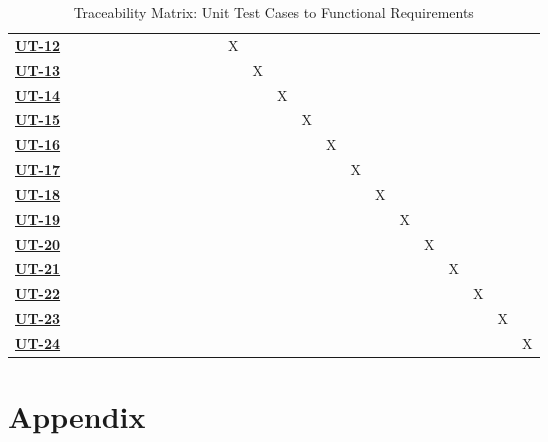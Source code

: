 \documentclass[12pt, titlepage]{article}
\begin{document}
\begin{enumerate}
\begin{landscape}
\begin{table}[H]
\begin{adjustbox}{width=1.4\textwidth}
\begin{tabular}{l|cccccccccccccccccccccccc}
        \hyperref[UT-12]{\textbf{UT-12}} &  &  &  &  &  &  &  &  &  &  &  & X &  &  &  &  &  &  &  &  &  &  &  &  \\
        \hyperref[UT-13]{\textbf{UT-13}} &  &  &  &  &  &  &  &  &  &  &  &  & X &  &  &  &  &  &  &  &  &  &  &  \\
        \hyperref[UT-14]{\textbf{UT-14}} &  &  &  &  &  &  &  &  &  &  &  &  &  & X &  &  &  &  &  &  &  &  &  &  \\
        \hyperref[UT-15]{\textbf{UT-15}} &  &  &  &  &  &  &  &  &  &  &  &  &  &  & X &  &  &  &  &  &  &  &  &  \\
        \hyperref[UT-16]{\textbf{UT-16}} &  &  &  &  &  &  &  &  &  &  &  &  &  &  &  & X &  &  &  &  &  &  &  &  \\
        \hyperref[UT-17]{\textbf{UT-17}} &  &  &  &  &  &  &  &  &  &  &  &  &  &  &  &  & X &  &  &  &  &  &  &  \\
        \hyperref[UT-17]{\textbf{UT-18}} &  &  &  &  &  &  &  &  &  &  &  &  &  &  &  &  & & X  &  &  &  &  &  &  \\
        \hyperref[UT-17]{\textbf{UT-19}} &  &  &  &  &  &  &  &  &  &  &  &  &  &  &  &  & & & X  &  &  &  &  &  \\
        \hyperref[UT-17]{\textbf{UT-20}} &  &  &  &  &  &  &  &  &  &  &  &  &  &  &  &  & & &  &  X  &  &  &  &  \\
        \hyperref[UT-17]{\textbf{UT-21}} &  &  &  &  &  &  &  &  &  &  &  &  &  &  &  &  & & &  &  &  X  &  &  &  \\
        \hyperref[UT-17]{\textbf{UT-22}} &  &  &  &  &  &  &  &  &  &  &  &  &  &  &  &  & & &  &  &  &  X  &  &  \\
        \hyperref[UT-17]{\textbf{UT-23}} &  &  &  &  &  &  &  &  &  &  &  &  &  &  &  &  & & &  &  &  &  &  X  &  \\
        \hyperref[UT-17]{\textbf{UT-24}} &  &  &  &  &  &  &  &  &  &  &  &  &  &  &  &  & & &  &  &  &  &  &  X  \\
        \hline
    \end{tabular}
    \end{adjustbox}
    \caption{Traceability Matrix: Unit Test Cases to Functional Requirements}
\end{table}
\end{landscape}


\newpage

\section{Appendix}


\end{enumerate}
\end{document}

